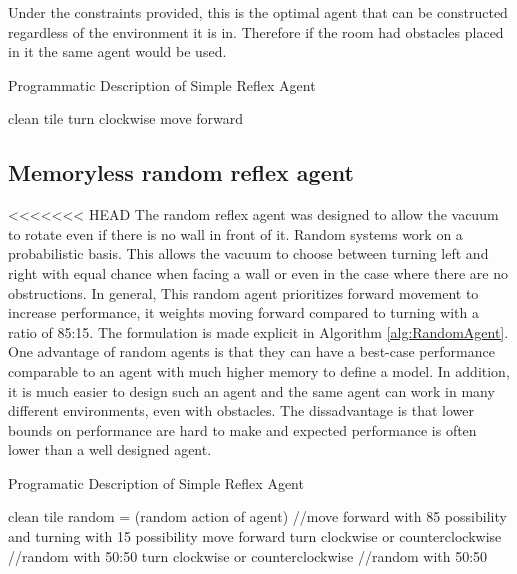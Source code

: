 \documentclass{article}
\begin{document}
Under the constraints provided, this is the optimal agent that can be constructed regardless of the environment it is in. Therefore if the room had obstacles placed in it the same agent would be used. 
\begin{algorithm}[h]
  
  \caption{Programmatic Description of Simple Reflex Agent}
  \begin{algorithmic}[1]
    
    \State clean tile 
    \EndIf
    \State turn clockwise
    \EndIf
    \State move forward
    \EndIf
    \EndFor
  \end{algorithmic}
  \label{alg:SimpleAgent}
\end{algorithm}
\subsection{Memoryless random reflex agent}
<<<<<<< HEAD
The random reflex agent was designed to allow the vacuum to rotate even if there is no wall in front of it. Random systems work on a probabilistic basis. This allows the vacuum to choose between turning left and right with equal chance when facing a wall or even in the case where there are no obstructions. In general, This random agent prioritizes forward movement to increase performance, it weights moving forward compared to turning with a ratio of 85:15.
The formulation is made explicit in Algorithm \ref{alg:RandomAgent}. One advantage of random agents is that they can have a best-case performance comparable to an agent with much higher memory to define a model. In addition, it is much easier to design such an agent and the same agent can work in many different environments, even with obstacles. The dissadvantage is that lower bounds on performance are hard to make and expected performance is often lower than a well designed agent. 


\begin{algorithm}[h]
  
  \caption{Programatic Description of Simple Reflex Agent}
  \begin{algorithmic}[1]
    
    \State clean tile 
    \EndIf
    \State random = (random action of agent) //move forward with 85 possibility and turning with 15 possibility
      \State move forward
      \Else 
      \State turn clockwise or counterclockwise //random with 50:50
      \EndIf
      \State turn clockwise or counterclockwise //random with 50:50
      \EndIf
      \EndIf
     
    \EndFor
  \end{algorithmic}
  \label{alg:RandomAgent}
\end{algorithm}
\end{document}
